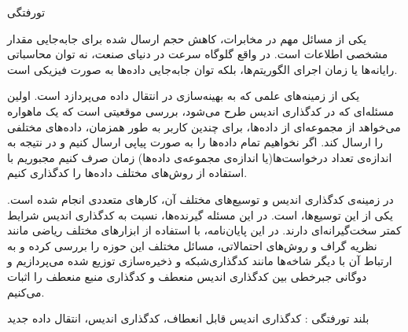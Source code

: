 


\begin{وسط‌چین}
\end{وسط‌چین}
‌تورفتگی

یکی از مسائل مهم در مخابرات، کاهش حجم ارسال شده برای جابه‌جایی مقدار مشخصی اطلاعات است. در واقع گلوگاه سرعت در دنیای صنعت، نه توان محاسباتی رایانه‌ها یا زمان اجرای الگوریتم‌ها، بلکه توان جابه‌جایی داده‌ها به صورت فیزیکی است.

یکی از زمینه‌های علمی که به بهینه‌سازی در انتقال داده می‌پردازد است. اولین مسئله‌ای که در کدگذاری اندیس طرح می‌شود، بررسی موقعیتی است که یک ماهواره می‌خواهد از مجموعه‌ای از داده‌ها، برای چندین کاربر به طور همزمان، داده‌های مختلفی را ارسال کند. اگر نخواهیم تمام داده‌ها را به صورت پیاپی ارسال کنیم و در نتیجه به اندازه‌ی تعداد درخواست‌ها(یا اندازه‌ی مجموعه‌ی داده‌ها) زمان صرف کنیم مجبوریم با استفاده از روش‌های مختلف داده‌ها را کدگذاری کنیم.

در زمینه‌ی کدگذاری اندیس و توسیع‌های مختلف آن، کارهای متعددی انجام شده است. یکی از این توسیع‌ها،  است. در این مسئله گیرنده‌ها، نسبت به کدگذاری اندیس شرایط کمتر سخت‌گیرانه‌ای دارند. در این پایان‌‌نامه، با استفاده از ابزارهای مختلف ریاضی مانند نظریه گراف و روش‌های احتمالاتی، مسائل مختلف این حوزه را بررسی کرده و به ارتباط آن با دیگر شاخه‌ها مانند کدگذار‌ی‌شبکه و ذخیره‌سازی توزیع شده می‌پردازیم و دوگانی جبرخطی بین کدگذاری اندیس منعطف و کدگذاری منبع منعطف را اثبات می‌کنیم.

‌بلند
‌تورفتگی :
کدگذاری اندیس قابل انعطاف، کدگذاری اندیس، انتقال داده
‌جدید
